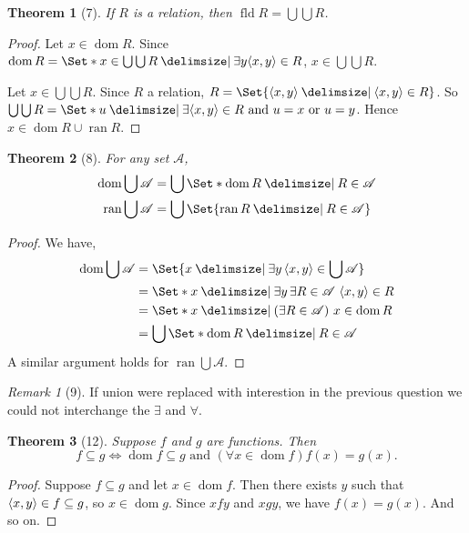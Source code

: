 \documentclass[12pt]{article}
\theoremstyle{plain}
\newtheorem*{exthm}{Theorem}
\theoremstyle{remark}
\theoremstyle{definition}
\theoremstyle{remark}
\newtheorem*{remark}{Remark}
\providecommand\st{}
\newcommand\SetSymbol[1][]{%
\nonscript\:#1\vert%
\allowbreak%
\nonscript\:
\mathopen{}}
\DeclarePairedDelimiter{\ang}{\langle}{\rangle}
\renewcommand\st{\SetSymbol[\delimsize]}
\renewcommand{\iff}{\Leftrightarrow}
\DeclareMathOperator{\dom}{dom}
\DeclareMathOperator{\ran}{ran}
\DeclareMathOperator{\fld}{fld}
\begin{document}
\begin{exthm}[7]
If $R$ is a relation, then $\fld{R} = \bigcup\bigcup R$.
\end{exthm}
\begin{proof}
Let $x \in \dom{R}$. Since $\dom{R} = \Set*{x \in \bigcup\bigcup R \st \exists y \ang{x,y} \in R}$, $x \in \bigcup\bigcup R$.

Let $x \in \bigcup\bigcup R$. Since $R$ a relation, $R = \Set{\ang{x, y} \st \ang{x,y} \in R}$. So $\bigcup \bigcup R = \Set*{u \st \exists \ang{x,y} \in R \text{ and } u = x \text{ or } u = y}$. Hence $x \in \dom{R} \cup \ran{R}$.
\end{proof}
\begin{exthm}[8]
For any set $\mathscr{A}$,
\begin{align*}
\dom{\bigcup \mathscr{A}} &= \bigcup \Set*{\dom{R} \st R \in \mathscr{A}}\\
\ran{\bigcup \mathscr{A}} &= \bigcup \Set{\ran{R} \st R \in \mathscr{A}}
\end{align*}
\end{exthm}
\begin{proof}
We have,
\begin{align*}
\dom{\bigcup \mathscr{A}} &= \Set{x \st \exists y\, \ang{x, y} \in \bigcup \mathscr{A}}\\
&= \Set*{x \st \exists y\, \exists R \in \mathscr{A}\ \ang{x,y} \in R}\\
&= \Set*{x \st (\exists R \in \mathscr{A})\ x \in \dom{R}}\\
&= \bigcup \Set*{\dom{R} \st R \in \mathscr{A}}
\end{align*}
A similar argument holds for $\ran \bigcup \mathscr{A}$.
\end{proof}
\begin{remark}[9]
If union were replaced with interestion in the previous question we could not interchange the $\exists$ and $\forall$.
\end{remark}

\begin{exthm}[12]
Suppose $f$ and $g$ are functions. Then
\[
f \subseteq g \iff \dom{f} \subseteq g \text{ and  } (\forall x \in \dom{f}) f(x) = g(x).
\]
\end{exthm}
\begin{proof}
Suppose $f \subseteq g$ and let $x \in \dom{f}$. Then there exists $y$ such that $\ang{x, y} \in f \subseteq g$, so $x \in \dom{g}$. Since $xfy$ and $xgy$, we have $f(x) = g(x)$. And so on.
\end{proof}
\end{document}
